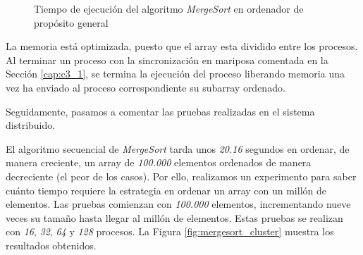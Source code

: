 		\begin{figure}[!h]
		\caption{Tiempo de ejecución del algoritmo \textit{MergeSort} en ordenador de propósito general}
		\label{fig:mergesort_hist}
		\end{figure}
		
			
		
		La memoria está optimizada, puesto que el array esta dividido entre los procesos. Al terminar un proceso con la sincronización en mariposa comentada en la Sección \ref{cap:c3_1}, se termina la ejecución del proceso liberando memoria una vez ha enviado al proceso correspondiente su subarray ordenado.
		
		
		
		Seguidamente, pasamos a comentar las pruebas realizadas en el sistema distribuido.
		
		El algoritmo secuencial de \textit{MergeSort} tarda unos \textit{20.16} segundos en ordenar, de manera creciente, un array de \textit{100.000} elementos ordenados de manera decreciente (el peor de los casos). Por ello, realizamos un experimento para saber cuánto tiempo requiere la estrategia en ordenar un array con un millón de elementos. Las pruebas comienzan con \textit{100.000} elementos, incrementando nueve veces su tamaño hasta llegar al millón de elementos. Estas pruebas se realizan con \textit{16}, \textit{32}, \textit{64} y \textit{128} procesos. La Figura \ref{fig:mergesort_cluster} muestra los resultados obtenidos. 
		
